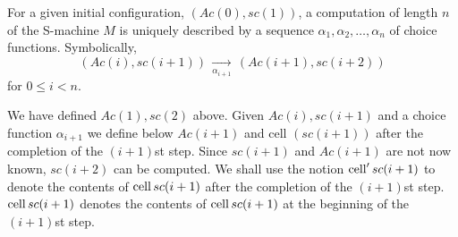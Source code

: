 For a given initial configuration, $(Ac(0), sc(1))$, a computation of length $n$
of the S-machine $M$ is uniquely described by a sequence $\alpha_1,\alpha_2,\ldots,
\alpha_n$ of choice functions.
Symbolically,
\[
    (Ac(i), sc(i+1)) \, \xrightarrow[\alpha_{i+1}]{} \, (Ac(i+1), sc(i+2))
\]
for $0 \leq i < n$.

We have defined $Ac(1), sc(2)$ above.
Given $Ac(i), sc(i+1)$ and a choice function $\alpha_{i+1}$ we define
below $Ac(i+1)$ and cell $(sc(i+1))$ after the completion of the $(i+1)$st step.  Since $sc(i+1)$ and $Ac(i+1)$ are not
now known, $sc(i+2)$ can be computed.
We shall use the notion $\mathrm{cell}'\,sc(i+1)$ to denote the contents of $\mathrm{cell}\,sc(i+1)$
after the completion of the $(i+1)$st step.
$\mathrm{cell}\,sc(i+1)$ denotes the contents of $\mathrm{cell}\,sc(i+1)$ at the beginning of the $(i+1)$st step.


